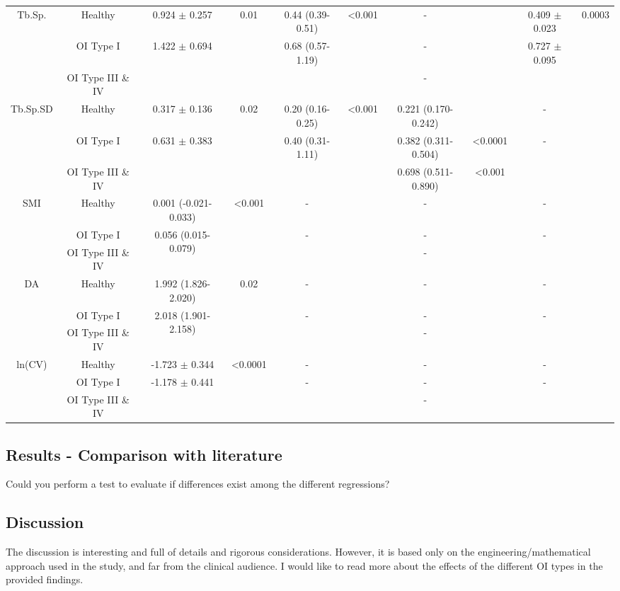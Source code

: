 \documentclass{AR2RC}
\begin{document}
\begin{sidewaystable*}
{\begin{tabular}{cccccccccc}
		\multirow{3}{*}{Tb.Sp.} & Healthy & 0.924 $\pm$ 0.257 & 0.01 & 0.44 (0.39-0.51) & <0.001 & - & & 0.409 $\pm$ 0.023 & 0.0003 \\
		& OI Type I & \multirow{2}{*}{1.422 $\pm$ 0.694} &  & 0.68 (0.57-1.19) &  & - &  & \multirow{2}{*}{0.727 $\pm$ 0.095} & \\
		&  OI Type III \& IV & & & & & - &  & & \\[3ex]
		
		\multirow{3}{*}{Tb.Sp.SD} & Healthy & 0.317 $\pm$ 0.136 & 0.02 & 0.20 (0.16-0.25) & <0.001 & 0.221 (0.170-0.242) & & - &  \\
		& OI Type I & \multirow{2}{*}{0.631 $\pm$ 0.383} &  & 0.40 (0.31-1.11) &  & 0.382 (0.311-0.504) & <0.0001 & - & \\
		&  OI Type III \& IV & & & & & 0.698 (0.511-0.890) & <0.001 & & \\[3ex]
		
		\multirow{3}{*}{SMI} & Healthy & 0.001 (-0.021-0.033) & <0.001 & - &  & - & & - &  \\
		& OI Type I & \multirow{2}{*}{0.056 (0.015-0.079)} &  & - &  & - &  & - & \\
		&  OI Type III \& IV & & & & & - &  & & \\[3ex]
		
		\multirow{3}{*}{DA} & Healthy & 1.992 (1.826-2.020) & 0.02 & - &  & - & & - &  \\
		& OI Type I & \multirow{2}{*}{2.018 (1.901-2.158)} &  & - &  & - &  & - & \\
		&  OI Type III \& IV & & & & & - &  & & \\[3ex]
		
		\multirow{3}{*}{ln(CV)} & Healthy & -1.723 $\pm$ 0.344 & <0.0001 & - &  & - & & - &  \\
		& OI Type I & \multirow{2}{*}{-1.178 $\pm$ 0.441} &  & - &  & - &  & - & \\
		&  OI Type III \& IV & & & & & - &  & & \\
		
		\bottomrule
	\end{tabular}}
\end{sidewaystable*}

\subsection{Results - Comparison with literature}
Could you perform a test to evaluate if differences exist among the different regressions?

\subsection{Discussion}
The discussion is interesting and full of details and rigorous considerations. However, it is based only on the engineering/mathematical approach used in the study, and far from the clinical audience. I would like to read more about the effects of the different OI types in the provided findings.
\end{document}
